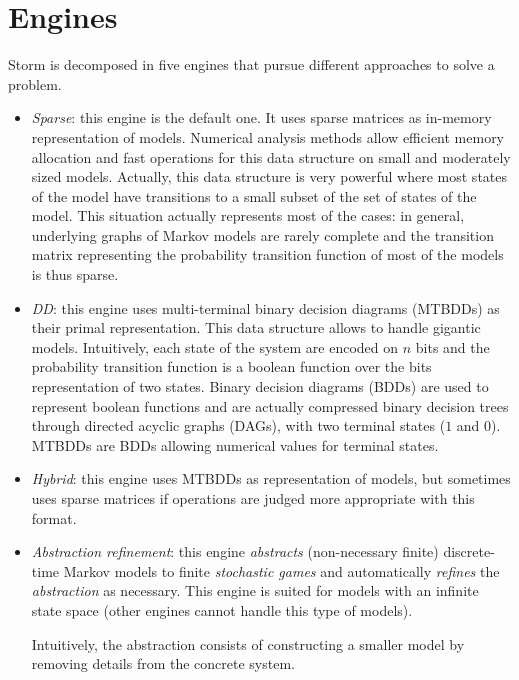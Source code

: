 \section{Engines}
Storm is decomposed in five engines that pursue different approaches to solve a problem.
\begin{itemize}
  \item \textit{Sparse}: this engine is the default one. It uses sparse matrices as in-memory representation of models. Numerical analysis methods allow efficient memory allocation and fast operations for this data structure on small and moderately sized models.
  Actually, this data structure is very powerful where most states of the model have transitions to a small subset of the set of states of the model. This situation actually represents most of the cases: in general, underlying graphs of Markov models are rarely complete and the transition matrix representing the probability transition function of
  most of the models is thus sparse.
  \item \textit{DD}: this engine uses multi-terminal binary decision diagrams (MTBDDs) \cite{Fujita:1997:MBD:607541.607565} as their primal representation. This data structure allows
  to handle gigantic models. Intuitively, each state of the system are encoded on $n$ bits and the probability transition function is a boolean function
  over the bits representation of two states. Binary decision diagrams (BDDs) \cite{PMC} are
  used to represent boolean functions and are actually compressed binary decision trees through directed acyclic graphs (DAGs), with two terminal states ($1$ and $0$). MTBDDs are BDDs allowing numerical values for terminal states.
  \item \textit{Hybrid}: this engine uses MTBDDs as representation of models, but sometimes uses sparse matrices if operations are judged more appropriate with this format.
  \item \textit{Abstraction refinement}: this engine \textit{abstracts} (non-necessary finite) discrete-time Markov models to finite \textit{stochastic games} and automatically \textit{refines} the \textit{abstraction} as necessary. This engine is suited for models with an infinite state space (other engines cannot handle this type of models).
  \par Intuitively, the abstraction consists of constructing a smaller model by removing details from the concrete system.

\end{itemize}

